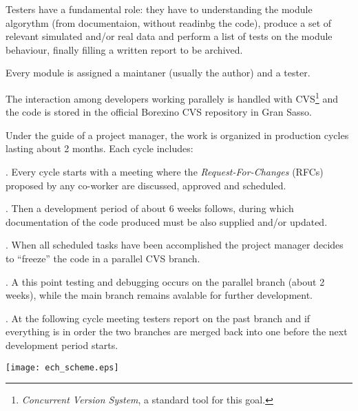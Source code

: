 Testers have a fundamental role: they have to understanding the module algorythm (from documentaion, without readinbg the code), 
produce a set of relevant simulated and/or real data and perform a list of tests on the module behaviour, finally filling a written report to be archived. 

Every module is assigned a maintaner (usually the author) and a tester.

The interaction among developers working parallely is handled with CVS\footnote{\emph{Concurrent Version System}, a standard tool for this goal\cite{???}.} 
and the code is stored in the official Borexino CVS repository in Gran Sasso.

Under the guide of a project manager, the work is organized in production cycles lasting about 2 months.
Each cycle includes:
\bde
\item[Meeting]. Every cycle starts with a meeting where the \emph{Request-For-Changes} (RFCs) proposed by any co-worker are discussed, approved and scheduled.
\item[Development]. Then a development period of about 6 weeks follows, during which documentation of the code produced must be also supplied and/or updated.
\item[Branch spawning]. When all scheduled tasks have been accomplished the project manager decides to ``freeze'' the code in a parallel CVS branch.
\item[Tests]. A this point testing and debugging occurs on the parallel branch (about 2 weeks), while the main branch remains avalable for further development.
\item[Merging]. At the following cycle meeting testers report on the past branch and if everything is in order the two branches are merged back into one before the next development period starts. 
\ede

\bfig
\texttt{[image: ech\_scheme.eps]}
\efig
